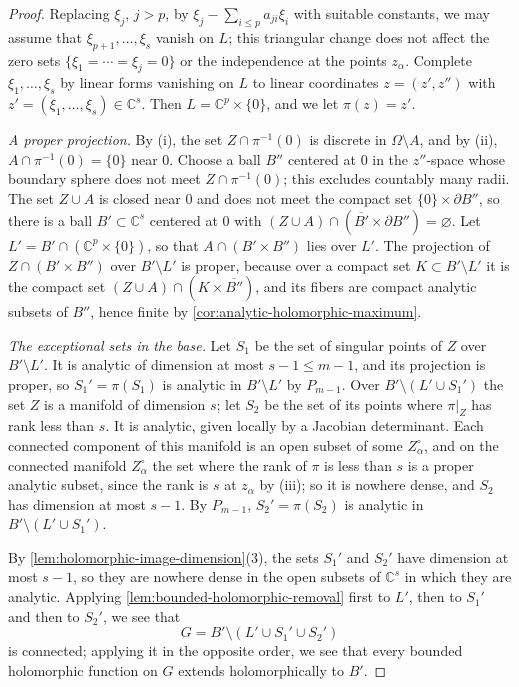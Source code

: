 \begin{proof}
Replacing $\xi_j$, $j>p$, by $\xi_j-\sum_{i\leq p}a_{ji}\xi_i$ with suitable constants, we may assume that $\xi_{p+1},\ldots,\xi_s$ vanish on $L$; this triangular change does not affect the zero sets $\{\xi_1=\cdots=\xi_j=0\}$ or the independence at the points $z_\alpha$. Complete $\xi_1,\ldots,\xi_s$ by linear forms vanishing on $L$ to linear coordinates $z=(z',z'')$ with $z'=(\xi_1,\ldots,\xi_s)\in\mathbb C^s$. Then $L=\mathbb C^p\times\{0\}$, and we let $\pi(z)=z'$.

\emph{A proper projection.} By (i), the set $Z\cap\pi^{-1}(0)$ is discrete in $\Omega\setminus A$, and by (ii), $A\cap\pi^{-1}(0)=\{0\}$ near $0$. Choose a ball $B''$ centered at $0$ in the $z''$-space whose boundary sphere does not meet $Z\cap\pi^{-1}(0)$; this excludes countably many radii. The set $Z\cup A$ is closed near $0$ and does not meet the compact set $\{0\}\times\partial B''$, so there is a ball $B'\subset\mathbb C^s$ centered at $0$ with $(Z\cup A)\cap(\overline{B'}\times\partial B'')=\varnothing$. Let $L'=B'\cap(\mathbb C^p\times\{0\})$, so that $A\cap(B'\times B'')$ lies over $L'$. The projection of $Z\cap(B'\times B'')$ over $B'\setminus L'$ is proper, because over a compact set $K\subset B'\setminus L'$ it is the compact set $(Z\cup A)\cap(K\times\overline{B''})$, and its fibers are compact analytic subsets of $B''$, hence finite by \cref{cor:analytic-holomorphic-maximum}.

\emph{The exceptional sets in the base.} Let $S_1$ be the set of singular points of $Z$ over $B'\setminus L'$. It is analytic of dimension at most $s-1\leq m-1$, and its projection is proper, so $S_1'=\pi(S_1)$ is analytic in $B'\setminus L'$ by $P_{m-1}$. Over $B'\setminus(L'\cup S_1')$ the set $Z$ is a manifold of dimension $s$; let $S_2$ be the set of its points where $\pi|_Z$ has rank less than $s$. It is analytic, given locally by a Jacobian determinant. Each connected component of this manifold is an open subset of some $Z^\circ_\alpha$, and on the connected manifold $Z^\circ_\alpha$ the set where the rank of $\pi$ is less than $s$ is a proper analytic subset, since the rank is $s$ at $z_\alpha$ by (iii); so it is nowhere dense, and $S_2$ has dimension at most $s-1$. By $P_{m-1}$, $S_2'=\pi(S_2)$ is analytic in $B'\setminus(L'\cup S_1')$.

By \cref{lem:holomorphic-image-dimension}(3), the sets $S_1'$ and $S_2'$ have dimension at most $s-1$, so they are nowhere dense in the open subsets of $\mathbb C^s$ in which they are analytic. Applying \cref{lem:bounded-holomorphic-removal} first to $L'$, then to $S_1'$ and then to $S_2'$, we see that
\[
 G=B'\setminus(L'\cup S_1'\cup S_2')
\]
is connected; applying it in the opposite order, we see that every bounded holomorphic function on $G$ extends holomorphically to $B'$.


\end{proof}
